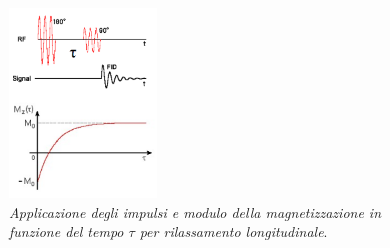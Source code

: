 \documentclass{report}
\numberwithin{equation}{section}
\numberwithin{figure}{section}
\begin{document}
\begin{figure}
    \centering
    \includegraphics[width=0.35\textwidth]{immagini/long.png}
    \caption{\textit{Applicazione degli impulsi e modulo della magnetizzazione in funzione del tempo $\tau$ per rilassamento longitudinale}.}
    \label{fig:long}
\end{figure}
\end{document}

